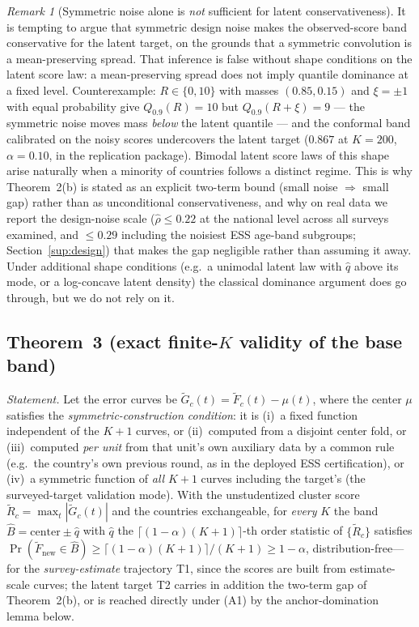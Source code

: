 \documentclass[12pt]{article}
\theoremstyle{definition}
\theoremstyle{remark}
\newtheorem{remark}{Remark}
\newcommand{\Ftilde}{\widetilde{F}}
\newcommand{\Gtilde}{\widetilde{G}}
\newcommand{\rhohat}{\widehat{\rho}}
\begin{document}
\begin{remark}[Symmetric noise alone is \emph{not} sufficient for latent
conservativeness]\label{rem:bimodal}
It is tempting to argue that symmetric design noise makes the observed-score band
conservative for the latent target, on the grounds that a symmetric convolution is a
mean-preserving spread. That inference is false without shape conditions on the latent
score law: a mean-preserving spread does not imply quantile dominance at a fixed level.
Counterexample: $R\in\{0,10\}$ with masses $(0.85,0.15)$ and $\xi=\pm1$ with equal
probability give $Q_{0.9}(R)=10$ but $Q_{0.9}(R+\xi)=9$ --- the symmetric noise moves
mass \emph{below} the latent quantile --- and the conformal band calibrated on the noisy
scores undercovers the latent target ($0.867$ at $K=200$, $\alpha=0.10$, in the
replication package). Bimodal
latent score laws of this shape arise naturally when a minority of countries follows a
distinct regime. This is why Theorem~2(b) is stated as an explicit two-term bound (small
noise $\Rightarrow$ small gap) rather than as unconditional conservativeness, and why on
real data we report the design-noise scale ($\rhohat\le0.22$ at the national level
across all surveys examined, and $\le0.29$ including the noisiest ESS age-band
subgroups; Section~\ref{sup:design}) that makes the gap negligible rather than assuming it away. Under additional
shape conditions (e.g.\ a unimodal latent law with $\widehat q$ above its mode, or a
log-concave latent density) the classical dominance argument does go through, but we do
not rely on it.
\end{remark}

\subsection{Theorem~3 (exact finite-$K$ validity of the base band)}

\emph{Statement.} Let the error curves be $\Gtilde_c(t)=\Ftilde_c(t)-\mu(t)$, where the
center $\mu$ satisfies the \emph{symmetric-construction condition}: it is (i)~a fixed
function independent of the $K{+}1$ curves, or (ii)~computed from a disjoint center
fold, or (iii)~computed \emph{per unit} from that unit's own auxiliary data by a common
rule (e.g.\ the country's own previous round, as in the deployed ESS certification), or
(iv)~a symmetric function of \emph{all} $K{+}1$ curves including the target's (the
surveyed-target validation mode). With the unstudentized cluster score
$\widetilde R_c=\max_t|\Gtilde_c(t)|$ and the countries exchangeable, for \emph{every} $K$ the band
$\widehat B=\text{center}\pm\widehat q$ with $\widehat q$ the
$\lceil(1-\alpha)(K{+}1)\rceil$-th order statistic of $\{\widetilde R_c\}$
satisfies
$\Pr(\Ftilde_{\text{new}}\in\widehat B)\ge\lceil(1-\alpha)(K{+}1)\rceil/(K{+}1)\ge
1-\alpha$, distribution-free---for the \emph{survey-estimate} trajectory T1,
since the scores are built from estimate-scale curves; the latent target T2
carries in addition the two-term gap of Theorem~2(b), or is reached directly
under (A1) by the anchor-domination lemma below.
\end{document}
